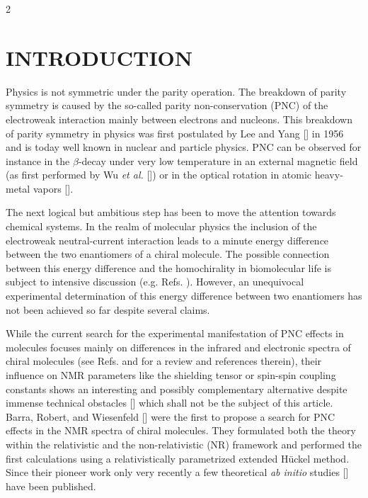 \documentclass[a4paper,12pt,english]{article}
\begin{document}
\begin{spacing}{2}
\section{INTRODUCTION}

\noindent Physics is not symmetric under the parity operation. The breakdown of parity symmetry is caused by the so-called parity non-conservation (PNC) of the electroweak interaction mainly between electrons and nucleons. This breakdown of parity symmetry in physics was first postulated by Lee and Yang [\cite{lee1956physrev}] in 1956 and is today well known in nuclear and particle physics. PNC can be observed for instance in the $\beta$-decay under very low temperature in an external magnetic field (as first performed by Wu \emph{et al.} [\cite{wu1957physrev}]) or in the optical rotation in atomic heavy-metal vapors [\cite{macpherson1991physrevlett,meekhof1993physrevlett,edwards1995physrevlett}].

\par The next logical but ambitious step has been to move the attention towards chemical systems. In the realm of molecular physics the inclusion of the electroweak neutral-current interaction leads to a minute energy difference between the two enantiomers of a chiral molecule. The possible connection between this energy difference and the homochirality in biomolecular life is subject to intensive discussion (e.g. Refs. \cite{quack2002angewcheminted,schwerdtfeger:yamagata,schwerdtfeger:salam}). However, an unequivocal experimental determination of this energy difference between two enantiomers has not been achieved so far despite several claims.

\par While the current search for the experimental manifestation of PNC effects in molecules focuses mainly on differences in the infrared and electronic spectra of chiral molecules (see Refs. \cite{berger} and \cite{ego:PNCrev} for a review and references therein), their influence on NMR parameters like the shielding tensor or spin-spin coupling constants shows an interesting and possibly complementary alternative despite immense technical obstacles [\cite{barra2001chirality}] which shall not be the subject of this article. Barra, Robert, and Wiesenfeld [\cite{barra1986physletta,barra1988europhyslett,barra1996molphys}] were the first to propose a search for PNC effects in the NMR spectra of chiral molecules. They formulated both the theory within the relativistic and the non-relativistic (NR) framework and performed the first calculations using a relativistically parametrized extended H\"uckel method. Since their pioneer work only very recently a few theoretical \emph{ab initio} studies [\cite{berger2003chemphyschem,lazzeretti2003physreva,weijo2000jchemphys}] have been published.


\end{spacing}
\end{document}
